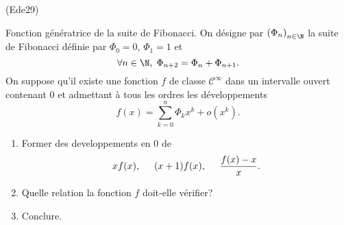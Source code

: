 \begin{tiny}(Ede29)\end{tiny} Fonction génératrice de la suite de Fibonacci.\newline
On désigne par $\left( \Phi_n \right)_{n \in \N}$ la suite de Fibonacci définie par $\Phi_0 = 0$, $\Phi_1 = 1$ et 
\[
 \forall n \in \N, \; \Phi_{n+2} = \Phi_n + \Phi_{n+1}.
\]
On suppose qu'il existe une fonction $f$ de classe $\mathcal{C}^{\infty}$ dans un intervalle ouvert contenant $0$ et admettant à tous les ordres les développements
\[
 f(x) = \sum_{k=0}^{n}\Phi_k x^k + o(x^k).
\]
\begin{enumerate}
 \item Former des developpements en $0$ de 
 \[
xf(x),\hspace{0.5cm} (x+1)f(x),\hspace{0.5cm} \frac{f(x) - x}{x}.  
 \]

 \item Quelle relation la fonction $f$ doit-elle vérifier?
 \item Conclure.
\end{enumerate}
